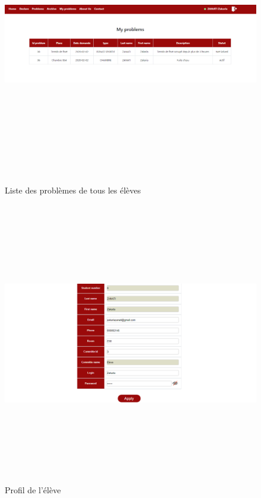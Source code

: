 \documentclass[11.5pt]{report}
\begin{document}
\newpage
\begin{figure}[h]
	
	\begin{center}
		\includegraphics[width=500pt,height=350pt]{myproblems.png} 
		\caption{Liste des problèmes de tous les élèves}
	\end{center}
	
\end{figure}
\newpage
\begin{figure}[h]
	
	\begin{center}
		\includegraphics[width=500pt,height=350pt]{profile.png} 
		\caption{Profil de l'élève}
	\end{center}
	
\end{figure}
\end{document}
